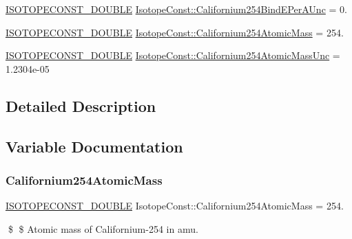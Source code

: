 \begin{DoxyCompactItemize}
\item 
\mbox{\hyperlink{group___isotope_const-_macros_ga8f45a7272ce02c0b4c65c44636ed719a}{I\+S\+O\+T\+O\+P\+E\+C\+O\+N\+S\+T\+\_\+\+D\+O\+U\+B\+LE}} \mbox{\hyperlink{group___isotope_const-_californium-_cf254_ga836ef0e75236fa99a1e422cf85b2e88a}{Isotope\+Const\+::\+Californium254\+Bind\+E\+Per\+A\+Unc}} = 0.
\item 
\mbox{\hyperlink{group___isotope_const-_macros_ga8f45a7272ce02c0b4c65c44636ed719a}{I\+S\+O\+T\+O\+P\+E\+C\+O\+N\+S\+T\+\_\+\+D\+O\+U\+B\+LE}} \mbox{\hyperlink{group___isotope_const-_californium-_cf254_ga62fc49b90db0c4df1d22aedcba58ae9c}{Isotope\+Const\+::\+Californium254\+Atomic\+Mass}} = 254.
\item 
\mbox{\hyperlink{group___isotope_const-_macros_ga8f45a7272ce02c0b4c65c44636ed719a}{I\+S\+O\+T\+O\+P\+E\+C\+O\+N\+S\+T\+\_\+\+D\+O\+U\+B\+LE}} \mbox{\hyperlink{group___isotope_const-_californium-_cf254_ga9c5f8ecbff305066189e8c174fc5c947}{Isotope\+Const\+::\+Californium254\+Atomic\+Mass\+Unc}} = 1.\+2304e-\/05
\end{DoxyCompactItemize}


\subsection{Detailed Description}


\subsection{Variable Documentation}
\mbox{\label{group___isotope_const-_californium-_cf254_ga62fc49b90db0c4df1d22aedcba58ae9c}} 
\subsubsection{\texorpdfstring{Californium254\+Atomic\+Mass}{Californium254AtomicMass}}
{\footnotesize\ttfamily \mbox{\hyperlink{group___isotope_const-_macros_ga8f45a7272ce02c0b4c65c44636ed719a}{I\+S\+O\+T\+O\+P\+E\+C\+O\+N\+S\+T\+\_\+\+D\+O\+U\+B\+LE}} Isotope\+Const\+::\+Californium254\+Atomic\+Mass = 254.}

\$ \$ Atomic mass of Californium-\/254 in amu. \mbox{\label{group___isotope_const-_californium-_cf254_ga9c5f8ecbff305066189e8c174fc5c947}} 
